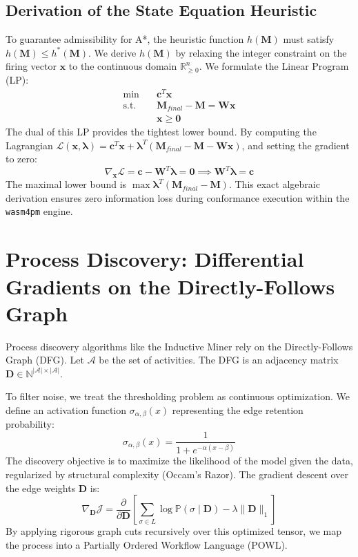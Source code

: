 \documentclass[11pt,a4paper,twocolumn]{article}
\begin{document}
\subsection{Derivation of the State Equation Heuristic}
To guarantee admissibility for A*, the heuristic function $h(\mathbf{M})$ must satisfy $h(\mathbf{M}) \le h^*(\mathbf{M})$. We derive $h(\mathbf{M})$ by relaxing the integer constraint on the firing vector $\mathbf{x}$ to the continuous domain $\mathbb{R}_{\ge 0}^n$.
We formulate the Linear Program (LP):
\begin{align*}
\min \quad & \mathbf{c}^T \mathbf{x} \\
\text{s.t.} \quad & \mathbf{M}_{final} - \mathbf{M} = \mathbf{W} \mathbf{x} \\
& \mathbf{x} \ge \mathbf{0}
\end{align*}
The dual of this LP provides the tightest lower bound. By computing the Lagrangian $\mathcal{L}(\mathbf{x}, \bm{\lambda}) = \mathbf{c}^T \mathbf{x} + \bm{\lambda}^T (\mathbf{M}_{final} - \mathbf{M} - \mathbf{W} \mathbf{x})$, and setting the gradient to zero:
\[ \nabla_{\mathbf{x}} \mathcal{L} = \mathbf{c} - \mathbf{W}^T \bm{\lambda} = \mathbf{0} \implies \mathbf{W}^T \bm{\lambda} = \mathbf{c} \]
The maximal lower bound is $\max \bm{\lambda}^T (\mathbf{M}_{final} - \mathbf{M})$. This exact algebraic derivation ensures zero information loss during conformance execution within the \texttt{wasm4pm} engine.

\section{Process Discovery: Differential Gradients on the Directly-Follows Graph}

Process discovery algorithms like the Inductive Miner rely on the Directly-Follows Graph (DFG). Let $\mathcal{A}$ be the set of activities. The DFG is an adjacency matrix $\mathbf{D} \in \mathbb{N}^{|\mathcal{A}| \times |\mathcal{A}|}$.

To filter noise, we treat the thresholding problem as continuous optimization. We define an activation function $\sigma_{\alpha, \beta}(x)$ representing the edge retention probability:
\[ \sigma_{\alpha, \beta}(x) = \frac{1}{1 + e^{-\alpha (x - \beta)}} \]
The discovery objective is to maximize the likelihood of the model given the data, regularized by structural complexity (Occam's Razor). The gradient descent over the edge weights $\mathbf{D}$ is:
\[ \nabla_{\mathbf{D}} \mathcal{J} = \frac{\partial}{\partial \mathbf{D}} \left[ \sum_{\sigma \in L} \log \mathbb{P}(\sigma \mid \mathbf{D}) - \lambda \lVert \mathbf{D} \rVert_1 \right] \]
By applying rigorous graph cuts recursively over this optimized tensor, we map the process into a Partially Ordered Workflow Language (POWL).
\end{document}
